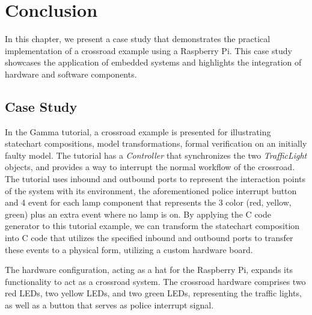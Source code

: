 \chapter{Conclusion}

In this chapter, we present a case study that demonstrates the practical implementation of a crossroad example using a Raspberry Pi. This case study showcases the application of embedded systems and highlights the integration of hardware and software components.

\section{Case Study}

In the Gamma tutorial, a crossroad example is presented for illustrating statechart compositions, model transformations, formal verification on an initially faulty model. The tutorial has a \textit{Controller} that synchronizes the two \textit{TrafficLight} objects, and provides a way to interrupt the normal workflow of the crossroad. The tutorial uses inbound and outbound ports to represent the interaction points of the system with its environment, the aforementioned police interrupt button and 4 event for each lamp component that represents the 3 color (red, yellow, green) plus an extra event where no lamp is on. By applying the C code generator to this tutorial example, we can transform the statechart composition into C code that utilizes the specified inbound and outbound ports to transfer these events to a physical form, utilizing a custom hardware board.

The hardware configuration, acting as a hat for the Raspberry Pi, expands its functionality to act as a crossroad system. The crossroad hardware comprises two red LEDs, two yellow LEDs, and two green LEDs, representing the traffic lights, as well as a button that serves as police interrupt signal.

